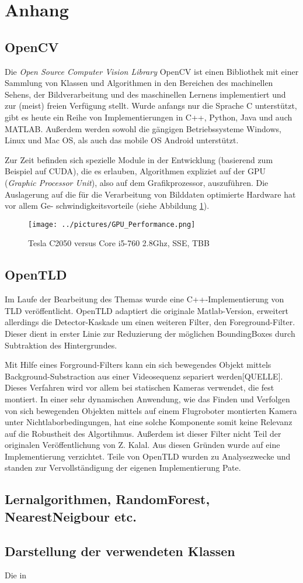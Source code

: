\section{Anhang}
\subsection*{OpenCV}
Die \textit{Open Source Computer Vision Library} OpenCV ist einen Bibliothek mit einer Sammlung von Klassen und Algorithmen in den Bereichen des machinellen Sehens, der Bildverarbeitung und des maschinellen Lernens implementiert und zur (meist) freien Verfügung stellt. Wurde anfangs nur die Sprache C unterstützt, gibt es heute ein Reihe von Implementierungen in C++, Python, Java und auch MATLAB. Außerdem werden sowohl die gängigen Betriebssysteme Windows, Linux und Mac OS, als auch das mobile OS Android unterstützt.

Zur Zeit befinden sich spezielle Module in der Entwicklung (basierend zum Beispiel auf CUDA), die es erlauben, Algorithmen expliziet auf der GPU (\textit{Graphic Processor Unit}), also auf dem Grafikprozessor, auszuführen. Die Auslagerung auf die für die Verarbeitung von Bilddaten optimierte Hardware hat vor allem Ge- schwindigkeitsvorteile (siehe Abbildung \ref{GPU_Performance}).

\begin{figure}
\centering{}\texttt{[image: ../pictures/GPU\_Performance.png]}\caption{Tesla C2050 versus Core i5-760 2.8Ghz, SSE, TBB \cite{OCW}}
\label{GPU_Performance}
\end{figure}

\subsection*{OpenTLD}
Im Laufe der Bearbeitung des Themas wurde eine C++-Implementierung von TLD veröffentlicht. OpenTLD adaptiert die originale Matlab-Version, erweitert allerdings die Detector-Kaskade um einen weiteren Filter, den Foreground-Filter. Dieser dient in erster Linie zur Reduzierung der möglichen BoundingBoxes durch Subtraktion des Hintergrundes.

Mit Hilfe eines Forground-Filters kann ein sich bewegendes Objekt mittels Background-Substraction aus einer Videosequenz separiert werden{[}QUELLE{]}. Dieses Verfahren wird vor allem bei statischen Kameras verwendet, die fest montiert. In einer sehr dynamischen Anwendung, wie das Finden und Verfolgen von sich bewegenden Objekten mittels auf einem Flugroboter montierten Kamera unter Nichtlaborbedingungen, hat eine solche Komponente somit keine Relevanz auf die Robustheit des Algortihmus. Außerdem ist dieser Filter nicht Teil der originalen Veröffentlichung von Z. Kalal. Aus diesen Gründen wurde auf eine Implementierung verzichtet. Teile von OpenTLD wurden zu Analysezwecke und standen zur Vervollständigung der eigenen Implementierung Pate.

\subsection*{Lernalgorithmen, RandomForest, NearestNeigbour etc.}

\subsection*{Darstellung der verwendeten Klassen}
Die in 

